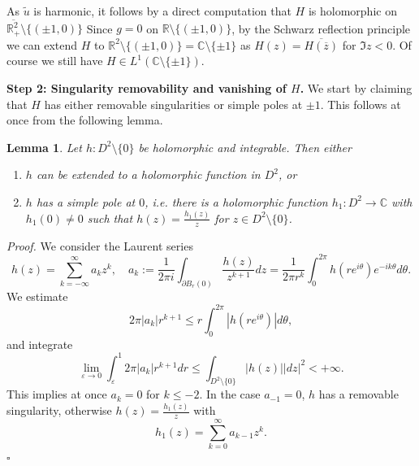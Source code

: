 \documentclass[12pt, a4paper]{article}
\newtheorem{lem}[thm]{Lemma}
\newenvironment{proof}{\noindent\emph{Proof.}}{\hfill$\square$\medskip}
\newcommand{\R}{\mathbb{R}}
\newcommand{\ve}{\varepsilon}
\newcommand{\blu}[1]{{\color{blue}#1}}
\renewcommand{\(}{\left(}
\renewcommand{\)}{\right)}
\begin{document}

As $\tilde u$ is harmonic, it follows by a direct computation that $H$ is holomorphic on $\overline{\R^2_+}\setminus \{(\pm 1,0)\}$ %
Since $g=0$ on $\R\setminus \{(\pm 1,0)\}$, by the Schwarz  reflection principle we can extend $H$ to $\R^2\setminus\{(\pm 1,0)\}=\mathbb{C}\setminus \{\pm 1\}$ as $H(z)= \overline{H(\overline{z})}$ for $\Im z<0$. Of course we still have $H\in L^1(\mathbb{C}\setminus \{\pm 1\})$.

\medskip

\noindent\textbf{Step 2: Singularity removability and vanishing of $H$.} We start by claiming that $H$ has either removable singularities or simple poles at $\pm 1$. This follows at once from the following lemma.

\begin{lem}\label{lemsing} Let $h: D^2\setminus \{0\}$ be holomorphic and integrable. Then either
\begin{enumerate}
\item $h$ can be extended to a holomorphic function in $D^2$, or
\item $h$ has a simple pole at $0$, i.e. there is a holomorphic function $h_1: D^2\to \mathbb{C}$ with $h_1(0)\ne 0$ such that $h(z)=\frac{h_1(z)}{z}$ for $z\in D^2\setminus\{0\}$.
\end{enumerate}
\end{lem}

\begin{proof} We consider the Laurent series
$$h(z)=\sum_{k=-\infty}^\infty a_kz^k,\quad a_k:=\frac{1}{2\pi i}\int_{\partial B_r(0)}\frac{h(z)}{z^{k+1}}{dz}= \frac{1}{{2\pi r^k}}\int_0^{2\pi} h(r e^{i\theta})e^{-ik\theta}d\theta.$$
We estimate
$$2\pi |a_k| r^{k+1}\le r \int_0^{2\pi}| h(r e^{i\theta})|d\theta,$$
and integrate
$$\lim_{\ve\to 0}\int_{\ve}^1 2\pi |a_k| r^{k+1} dr \le \int_{D^2\setminus \{0\}}|h(z)||dz|^2<+\infty.$$
This implies at once $a_k=0$ for $k\le -2$. In the case $a_{-1}=0$, $h$ has a removable singularity, otherwise $h(z)=\frac{h_1(z)}{z}$ with
$$h_1(z)=\sum_{k=0}^\infty a_{k-1}z^k.$$
\end{proof}
\end{document}
